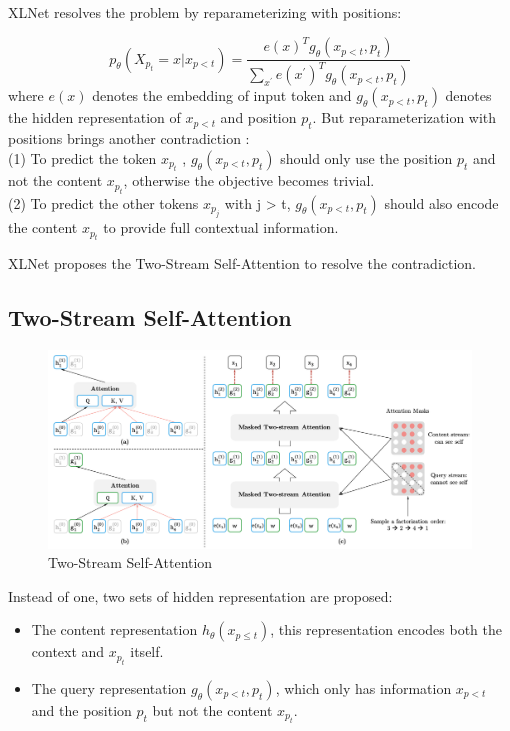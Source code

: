 \documentclass[]{krantz}
\providecommand{\tightlist}{%
  \setlength{\itemsep}{0pt}\setlength{\parskip}{0pt}}
\begin{document}
XLNet resolves the problem by reparameterizing with positions:

\[p_{\theta}(X_{p_t}=x|x_{p<t})=\frac{e(x)^Tg_{\theta}(x_{p<t},p_t)}{\sum_{x^{'}}e(x^{'})^Tg_{\theta}(x_{p<t},p_t)}\]
where \(e(x)\) denotes the embedding of input token and \(g_{\theta}(x_{p<t},p_t)\) denotes the hidden representation of \(x_{p<t}\) and position \(p_t\).
But reparameterization with positions brings another contradiction \citet{yang2019xlnet}:\\
(1) To predict the token \(x_{p_t}\) , \(g_{\theta}(x_{p<t},p_t)\) should only use the position \(p_t\) and not the content \(x_{p_t}\), otherwise the objective becomes trivial.\\
(2) To predict the other tokens \(x_{p_j}\) with j \textgreater{} t, \(g_{\theta}(x_{p<t},p_t)\) should also encode the content \(x_{p_t}\) to provide full contextual information.

XLNet proposes the Two-Stream Self-Attention to resolve the contradiction.

\hypertarget{two-stream-self-attention}{%
\subsection{Two-Stream Self-Attention}\label{two-stream-self-attention}}

\begin{figure}

{\centering \includegraphics[width=0.9\linewidth]{figures/02-03-transfer-learning-for-nlp/xlnet_ts} 

}

\caption{Two-Stream Self-Attention}\label{fig:ch02-03-figure011}
\end{figure}

Instead of one, two sets of hidden representation are proposed:

\begin{itemize}
\tightlist
\item
  The content representation \(h_{\theta}(x_{p \leq t})\), this representation encodes both the context and \(x_{p_t}\) itself.
\item
  The query representation \(g_{\theta}(x_{p<t},p_t)\), which only has information \(x_{p<t}\) and the position \(p_t\) but not the content \(x_{p_t}\).
\end{itemize}
\end{document}
